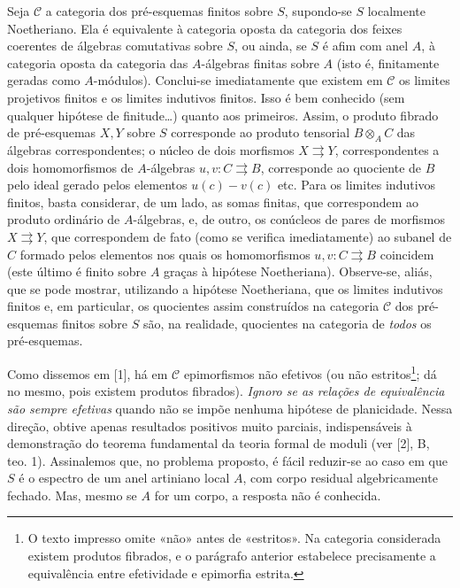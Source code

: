 \documentclass[11pt,twoside,openany]{book}
\numberwithin{equation}{section}
\newcommand{\src}[1]{%
  \phantomsection\hypertarget{src:#1}{}%
  \marginpar{\raggedleft\footnotesize\sffamily #1}%
}
\theoremstyle{plain}
\theoremstyle{definition}
\theoremstyle{remark}
\newcommand{\FgaUnitKey}{frontmatter}
\renewcommand{\src}[1]{%
  \phantomsection\hypertarget{src:\FgaUnitKey:#1}{}%
  \marginpar{\raggedleft\footnotesize\sffamily #1}%
}
\begin{document}
Seja $\mathcal C$ a categoria dos pré-esquemas finitos sobre $S$, supondo-se
$S$ localmente Noetheriano. Ela é equivalente à categoria oposta da categoria
dos feixes coerentes de álgebras comutativas sobre $S$, ou ainda, se $S$ é
afim com anel $A$, à categoria oposta da categoria das $A$-álgebras finitas
sobre $A$ (isto é, finitamente geradas como $A$-módulos). Conclui-se
imediatamente que existem em $\mathcal C$ os limites projetivos finitos e os
limites indutivos finitos. Isso é bem conhecido (sem qualquer hipótese de
finitude\ldots) quanto aos primeiros. Assim, o produto fibrado de pré-esquemas
$X,Y$ sobre $S$ corresponde ao produto tensorial $B\otimes_A C$ das álgebras
correspondentes; o núcleo de dois morfismos $X\rightrightarrows Y$,
correspondentes a dois homomorfismos de $A$-álgebras
$u,v:C\rightrightarrows B$, corresponde ao quociente de $B$ pelo ideal gerado
pelos elementos $u(c)-v(c)$ etc. Para os limites indutivos finitos, basta
considerar, de um lado, as somas finitas, que correspondem ao produto ordinário
de $A$-álgebras, e, de outro, os conúcleos de pares de morfismos
$X\rightrightarrows Y$, que correspondem de fato (como se verifica
imediatamente) ao subanel de $C$ formado pelos elementos nos quais os
homomorfismos $u,v:C\rightrightarrows B$ coincidem (este último é finito sobre
$A$ graças à hipótese Noetheriana). Observe-se, aliás, que se pode mostrar,
utilizando a hipótese Noetheriana, que os limites indutivos finitos e, em
particular, os quocientes assim construídos na categoria $\mathcal C$ dos
pré-esquemas finitos sobre $S$ são, na realidade, quocientes na categoria de
\emph{todos} os pré-esquemas.
\src{103}
Como dissemos em [1], há em $\mathcal C$ epimorfismos não efetivos (ou não
estritos\footnote{O texto impresso omite «não» antes de «estritos». Na
categoria considerada existem produtos fibrados, e o parágrafo anterior
estabelece precisamente a equivalência entre efetividade e epimorfia estrita.};
dá no mesmo, pois existem produtos fibrados). \emph{Ignoro se as relações de
equivalência são sempre efetivas} quando não se impõe nenhuma hipótese de
planicidade. Nessa direção, obtive apenas resultados positivos muito parciais,
indispensáveis à demonstração do teorema fundamental da teoria formal de
moduli (ver [2], B, teo. 1). Assinalemos que, no problema proposto, é fácil
reduzir-se ao caso em que $S$ é o espectro de um anel artiniano local $A$, com
corpo residual algebricamente fechado. Mas, mesmo se $A$ for um corpo, a
resposta não é conhecida.
\end{document}
